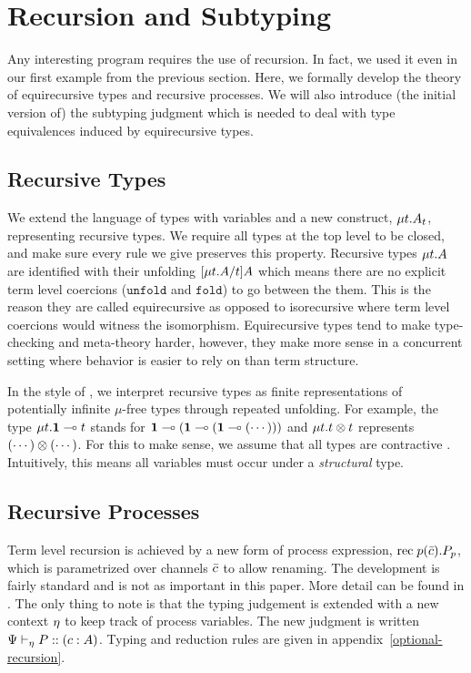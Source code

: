 \documentclass[a4paper,USenglish]{lipics-v2016}
\begin{document}
\section{Recursion and Subtyping}
\label{recursive}

Any interesting program requires the use of recursion. In fact, we used it even in our first example from the previous section. Here, we formally develop the theory of equirecursive types and recursive processes. We will also introduce (the initial version of) the subtyping judgment which is needed to deal with type equivalences induced by equirecursive types.

\subsection{Recursive Types}

We extend the language of types with variables and a new construct, $\mu{t} . {A_t}$, representing recursive types. We require all types at the top level to be closed, and make sure every rule we give preserves this property. Recursive types $\mu{t} . {A}$ are identified with their unfolding $\lbrack{\mu{t} . {A}}/{t}\rbrack{A}$ which means there are no explicit term level coercions ($\mathtt{unfold}$ and $\mathtt{fold}$) to go between the them. This is the reason they are called equirecursive as opposed to isorecursive where term level coercions would witness the isomorphism. Equirecursive types tend to make type-checking and meta-theory harder, however, they make more sense in a concurrent setting where behavior is easier to rely on than term structure. 

In the style of \cite{AmadioC91}, we interpret recursive types as finite representations of potentially infinite $\mu$-free types through repeated unfolding. For example, the type $\mu{t} . {\mathbf{1} \multimap t}$ stands for $\mathbf{1} \multimap (\mathbf{1} \multimap (\mathbf{1} \multimap (\cdots )))$ and $\mu{t} . {t \otimes t}$ represents $(\cdots) \otimes (\cdots)$. For this to make sense, we assume that all types are contractive \cite{StoneS2005, GayH05}. Intuitively, this means all variables must occur under a \emph{structural} type.


\subsection{Recursive Processes}

Term level recursion is achieved by a new form of process expression, $\mathrm{rec}\; {p}(\bar{c}) . {P}_p$, which is parametrized over channels $\bar{c}$ to allow renaming. The development is fairly standard and is not as important in this paper. More detail can be found in \cite{Toninho14}. The only thing to note is that the typing judgement is extended with a new context $\eta$ to keep track of process variables. The new judgment is written ${\Psi} \vdash_{\eta} P :: (c : A)$. Typing and reduction rules are given in appendix~\ref{optional-recursion}.
\end{document}
